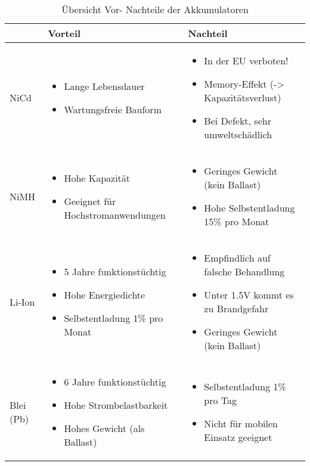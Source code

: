 \begin{table}[h!]
	\begin{tabular}{|p{1.2cm}|p{5.3cm}|p{5.3cm}|} \hline
		          &\textbf{Vorteil}  & \textbf{Nachteil}\\ \hline
		NiCd      & \begin{itemize} \item Lange Lebensdauer \item Wartungsfreie Bauform \end{itemize} & \begin{itemize} \item In der EU verboten! \item Memory-Effekt (-> Kapazitätsverlust) \item Bei Defekt, sehr umweltschädlich \end{itemize} \\ \hline
		NiMH      & \begin{itemize} \item Hohe Kapazität \item Geeignet für Hochstromanwendungen \end{itemize} & \begin{itemize} \item Geringes Gewicht (kein Ballast) \item Hohe Selbstentladung 15\% pro Monat \end{itemize}   \\ \hline
		Li-Ion    & \begin{itemize} \item 5 Jahre funktionstüchtig \item Hohe Energiedichte \item Selbstentladung 1\% pro Monat \end{itemize} & \begin{itemize} \item Empfindlich auf falsche Behandlung \item Unter 1.5V kommt es zu Brandgefahr \item Geringes Gewicht (kein Ballast) \end{itemize} \\ \hline
		Blei (Pb) & \begin{itemize} \item 6 Jahre funktionstüchtig \item Hohe Strombelastbarkeit \item Hohes Gewicht (als Ballast) \end{itemize} & \begin{itemize} \item Selbstentladung 1\% pro Tag \item Nicht für mobilen Einsatz geeignet \end{itemize} \\ \hline
	\end{tabular}
	\centering
	\caption{Übersicht Vor- Nachteile der Akkumulatoren}
	\label{tab:UebersichtVorNachTeil} 
\end{table}

